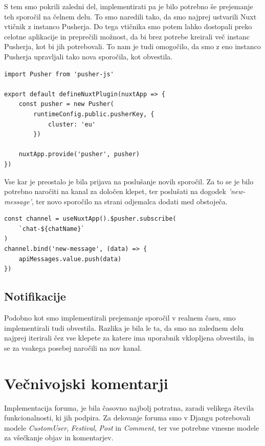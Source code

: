 \documentclass[a4paper,12pt,openright]{book}
\begin{document}
S tem smo pokrili zaledni del, implementirati pa je bilo potrebno še prejemanje teh sporočil na čelnem delu.
To smo naredili tako, da smo najprej ustvarili Nuxt vtičnik z instanco Pusherja.
Do tega vtičnika smo potem lahko dostopali preko celotne aplikacije in preprečili možnost, da bi brez potrebe kreirali več instanc Pusherja, kot bi jih potrebovali.
To nam je tudi omogočilo, da smo z eno instanco Pusherja upravljali tako nova sporočila, kot obvestila.

\begin{lstlisting}[label=code10,caption=Nuxt vtičnik za novo instanco Pusherja.,frame=tb,captionpos=b]
import Pusher from 'pusher-js'

export default defineNuxtPlugin(nuxtApp => {
    const pusher = new Pusher(
        runtimeConfig.public.pusherKey, {
            cluster: 'eu'
        })

    nuxtApp.provide('pusher', pusher)
})
\end{lstlisting}

Vse kar je preostalo je bila prijava na poslušanje novih sporočil.
Za to se je bilo potrebno naročiti na kanal za določen klepet, ter poslušati na dogodek \textit{'new-message'}, ter novo sporočilo na strani odjemalca dodati med obstoječa.

\begin{lstlisting}[label=code11,caption=Poslušanje na nova sporočila na čelnem delu.,frame=tb,captionpos=b]
const channel = useNuxtApp().$pusher.subscribe(
    `chat-${chatName}`
)       
channel.bind('new-message', (data) => {
    apiMessages.value.push(data)
})
\end{lstlisting}

\subsection{Notifikacije}
Podobno kot smo implementirali prejemanje sporočil v realnem času, smo implementirali tudi obvestila.
Razlika je bila le ta, da smo na zalednem delu najprej iterirali čez vse klepete za katere ima uporabnik vklopljena obvestila, in se za vsakega posebej naročili na nov kanal.

\section{Večnivojski komentarji}
Implementacija foruma, je bila časovno najbolj potratna, zaradi velikega števila funkcionalnosti, ki jih podpira.
Za delovanje foruma smo v Djangu potrebovali modele \textit{CustomUser}, \textit{Festival}, \textit{Post} in \textit{Comment}, ter vse potrebne vmesne modele za všečkanje objav in komentarjev.
\end{document}
